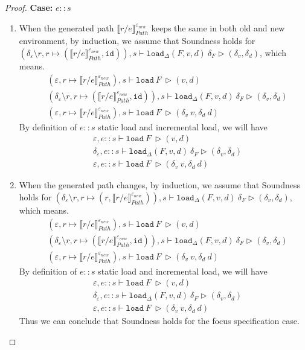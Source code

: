 \documentclass[10pt,twoside,a4paper]{article}
\theoremstyle{theorem}
\theoremstyle{lemma}
\theoremstyle{property}
\theoremstyle{definition}
\theoremstyle{assumption}
\def\id{\mathtt{id}}
\begin{document}
\begin{proof}
	\textbf{Case: } $e::s$\\
	\begin{enumerate}
	\item 
	When the generated path $\llbracket r/e \rrbracket^{\varepsilon_{new}}_{Path}$ keeps the same in both old and new environment, by induction, we assume that Soundness holds for $(\delta_\varepsilon \setminus r, r \mapsto (\llbracket r/e \rrbracket^{\varepsilon_{new}}_{Path}, \id)) , s \vdash \mathtt{load}_\Delta (F,v,d)~ \delta_F \rhd (\delta_v,\delta_d)$, which means.
	\begin{align*}
			& (\varepsilon, r \mapsto \llbracket r/e \rrbracket^{\varepsilon_{new}}_{Path}), s \vdash \mathtt{load}~ F~ \rhd (v,d)\\
			& (\delta_\varepsilon \setminus r, r \mapsto (\llbracket r/e \rrbracket^{\varepsilon_{new}}_{Path}, \id)) , s \vdash \mathtt{load}_\Delta (F,v,d)~ \delta_F \rhd (\delta_v,\delta_d)\\
			& (\varepsilon, r \mapsto \llbracket r/e \rrbracket^{\varepsilon_{new}}_{Path}), s \vdash \mathtt{load}~ F~ \rhd (\delta_v~v,\delta_d~d)
	\end{align*}
	By definition of $e::s$ static load and incremental load, we will have
	\begin{align*}
			& \varepsilon, e::s \vdash \mathtt{load}~ F~ \rhd (v,d)\\
			& \delta_\varepsilon, e::s \vdash \mathtt{load}_\Delta (F,v,d)~ \delta_F \rhd (\delta_v,\delta_d)\\
			& \varepsilon, e::s \vdash \mathtt{load}~ F~ \rhd (\delta_v~v,\delta_d~d)
	\end{align*}

	\item 
	When the generated path changes, by induction, we assume that Soundness holds for $(\delta_\varepsilon \setminus r, r \mapsto (r, \llbracket r/e \rrbracket^{\varepsilon_{new}}_{Path})) , s \vdash \mathtt{load}_\Delta (F,v,d)~ \delta_F \rhd (\delta_v,\delta_d)$, which means.
	\begin{align*}
			& (\varepsilon, r \mapsto \llbracket r/e \rrbracket^{\varepsilon_{new}}_{Path}), s \vdash \mathtt{load}~ F~ \rhd (v,d)\\
			& (\delta_\varepsilon \setminus r, r \mapsto (\llbracket r/e \rrbracket^{\varepsilon_{new}}_{Path}, \id)) , s \vdash \mathtt{load}_\Delta (F,v,d)~ \delta_F \rhd (\delta_v,\delta_d)\\
			& (\varepsilon, r \mapsto \llbracket r/e \rrbracket^{\varepsilon_{new}}_{Path}), s \vdash \mathtt{load}~ F~ \rhd (\delta_v~v,\delta_d~d)
	\end{align*}
	By definition of $e::s$ static load and incremental load, we will have
	\begin{align*}
			& \varepsilon, e::s \vdash \mathtt{load}~ F~ \rhd (v,d)\\
			& \delta_\varepsilon, e::s \vdash \mathtt{load}_\Delta (F,v,d)~ \delta_F \rhd (\delta_v,\delta_d)\\
			& \varepsilon, e::s \vdash \mathtt{load}~ F~ \rhd (\delta_v~v,\delta_d~d)
	\end{align*}
	Thus we can conclude that Soundness holds for the focus specification case.
	\end{enumerate}
	

\end{proof}
\end{document}
